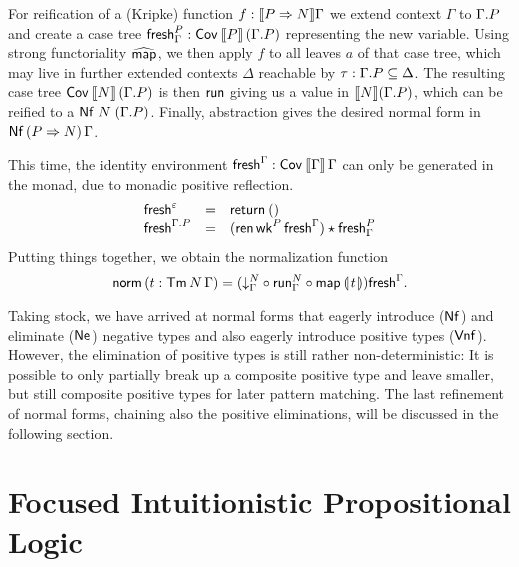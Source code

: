 \documentclass[sigconf,screen,fleqn]{acmart} %
\begin{document}
For reification of a (Kripke) function $f : \mathopen{{[\kern-0.14em[}} P \Rightarrow N \mathclose{{]\kern-0.14em]}} \Gamma$ we extend context
$\Gamma$ to $\Gamma.P$ and create a case tree
$\mathsf{fresh}^P_\Gamma : \mathsf{Cov}^{}\,\mathopen{{[\kern-0.14em[}} P \mathclose{{]\kern-0.14em]}}\,(\Gamma.P)$ representing the new
variable.  Using strong functoriality $\widehat{\mathsf{map}}^{}$,
we then apply $f$ to all leaves $a$ of that case tree,
which may live in further extended contexts $\Delta$ reachable by
$\tau : \Gamma.P \subseteq \Delta$.
The resulting case tree
$\mathsf{Cov}^{}\,\mathopen{{[\kern-0.14em[}} N \mathclose{{]\kern-0.14em]}}\,(\Gamma.P)$ is then $\mathsf{run}$ giving us a value
in $\mathopen{{[\kern-0.14em[}} N \mathclose{{]\kern-0.14em]}} {(\Gamma.P)}$, which can be reified to a
$\mathsf{Nf}\;N\;(\Gamma.P)$.  Finally, abstraction gives the desired
normal form in $\mathsf{Nf}\,(P \Rightarrow N)\,\Gamma$.




This time, the identity environment $\mathsf{fresh}^{\Gamma} : \mathsf{Cov}^{}\,\mathopen{{[\kern-0.14em[}} \Gamma \mathclose{{]\kern-0.14em]}}\,\Gamma$
can only be generated in the monad, due to monadic positive
reflection.
\[
\begin{array}{lcl}
  \mathsf{fresh}^{\varepsilon} & = & \mathsf{return}^{}\,() \\
  \mathsf{fresh}^{\Gamma.P} & = &
    (\mathsf{ren}\,\mathsf{wk}^P\,\mathsf{fresh}^{\Gamma}) \star \mathsf{fresh}^P_\Gamma \\
\end{array}
\]
Putting things together, we obtain the normalization function
\[
  \mathsf{norm}\,(t : \mathsf{Tm}^{\,}N\,\Gamma) =  (\mathord{\downarrow_{\Gamma}^{N}}
    \circ \mathsf{run}^N_\Gamma
    \circ \mathsf{map}^{}\,\llparenthesis\kern0.3ext\kern0.3ex\rrparenthesis) \mathsf{fresh}^{\Gamma}
.
\]

Taking stock, we have arrived at normal forms that eagerly introduce
($\mathsf{Nf}$) and eliminate ($\mathsf{Ne}^{}$) negative types and also eagerly
introduce positive types ($\mathsf{Vnf}$).  However, the elimination of
positive types is still rather non-deterministic:
It is possible to only partially break up a composite positive type
and leave smaller, but still composite positive types for later
pattern matching.
The last refinement of normal forms,
chaining also the positive eliminations, will be
discussed in the following section.


\section{Focused Intuitionistic Propositional Logic}
\label{sec:fipl}
\label{sec:pol}

\end{document}
